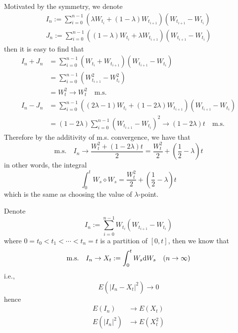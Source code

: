 \documentclass{homework}
\begin{document}
    \problem
    Motivated by the symmetry, we denote
    \newcommand{\sumhead}{\sum_{i=0}^{n-1}}
    \newcommand{\limhead}{\lim_{n\to\infty}}
    \newcommand{\wi}{W_{t_i}}
    \newcommand{\wii}{W_{t_{i+1}}}
    \newcommand{\deltaw}{\wii-\wi}
    \[\begin{aligned}
        I_n:=\sumhead\left(\lambda\wi+(1-\lambda)\wii\right)(\deltaw)\\
        J_n:=\sumhead\left((1-\lambda)\wi+\lambda\wii\right)(\deltaw)
    \end{aligned}\]
    then it is easy to find that
    \[\begin{aligned}
        I_n+J_n&=\sumhead(\wi+\wii)(\deltaw)\\
        &=\sumhead(\wii^2-\wi^2)\\
        &=W_t^2\to W_t^2\quad\text{m.s.}\\
        I_n-J_n&=\sumhead\left((2\lambda-1)\wi+(1-2\lambda)\wii\right)
                         (\deltaw)\\
               &=(1-2\lambda)\sumhead(\deltaw)^2
               \to (1-2\lambda)t\quad\text{m.s.}
    \end{aligned}\]
    Therefore by the additivity of m.s. convergence, we have
    that
    \[\text{m.s.}\quad I_n\to\frac{W_t^2+(1-2\lambda)t}{2}
    =\frac{W_t^2}{2}+\left(\frac{1}{2}-\lambda\right)t\]
    in other words, the integral
    \[\int_0^tW_s\diamond W_s
    =\frac{W_t^2}{2}+\left(\frac{1}{2}-\lambda\right)t\]
    which is the same as choosing the value of $\lambda$-point.

    \problem
    \label{var and e}
    \newcommand{\wj}{W_{t_j}}
    \newcommand{\wjj}{W_{t_{j+1}}}
    \newcommand{\deltawj}{\wjj-\wj}
    Denote
    \[I_n:=\sumhead\wi(\deltaw)\]
    where $0=t_0<t_1<\cdots<t_n=t$ is a partition of $[0,t]$,
    then we know that
    \[\text{m.s.}\quad I_n\to X_t:=\int_0^tW_s\mathrm d W_s
    \quad(n\to\infty)\]
    i.e.,
    \[E(|I_n-X_t|^2)\to 0\]
    hence
    \[\begin{aligned}
        E(I_n)&\to E(X_t)\\
        E(|I_n|^2)&\to E(X_t^2)
    \end{aligned}\]
\end{document}

